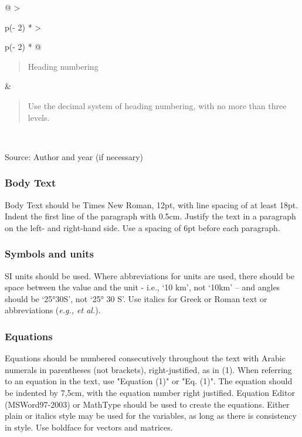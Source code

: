 \documentclass[12pt,a4paper]{article}
\begin{document}
\begin{longtable}[]{@{}
  >{\raggedright\arraybackslash}p{(\columnwidth - 2\tabcolsep) * }
  >{\raggedright\arraybackslash}p{(\columnwidth - 2\tabcolsep) * }@{}}
\begin{minipage}[t]{\linewidth}\raggedright
\begin{quote}
Heading numbering
\end{quote}
\end{minipage} & \begin{minipage}[t]{\linewidth}\raggedright
\begin{quote}
Use the decimal system of heading numbering, with no more than three
levels.
\end{quote}
\end{minipage} \\
\end{longtable}

Source: Author and year (if necessary)

\subsubsection{Body Text}

Body Text should be Times New Roman, 12pt, with line spacing of at least
18pt. Indent the first line of the paragraph with 0.5cm. Justify the
text in a paragraph on the left- and right-hand side. Use a spacing of
6pt before each paragraph.

\subsubsection{Symbols and units}

SI units should be used. Where abbreviations for units are used, there
should be space between the value and the unit - i.e., `10 km', not
`10km' -- and angles should be `25°30\textquotesingle S', not `25°
30\textquotesingle{} S'. Use italics for Greek or Roman text or
abbreviations (\emph{e.g., et al.}).

\subsubsection{Equations}

Equations should be numbered consecutively throughout the text with
Arabic numerals in parentheses (not brackets), right-justified, as in
(1). When referring to an equation in the text, use "Equation (1)" or
"Eq. (1)". The equation should be indented by 7,5cm, with the equation
number right justified. Equation Editor (MSWord97-2003) or MathType
should be used to create the equations. Either plain or italics style
may be used for the variables, as long as there is consistency in style.
Use boldface for vectors and matrices.
\end{document}

